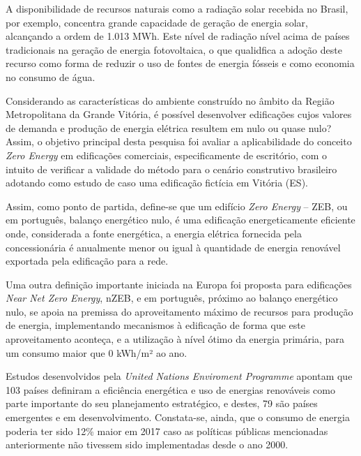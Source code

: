 \begin{onehalfspace}
    \noindent A disponibilidade de recursos naturais como a radiação solar recebida 
    no Brasil, por exemplo, concentra grande capacidade de geração de energia solar,
    alcançando a ordem de 1.013 MWh. Este nível de radiação nível acima de países 
    tradicionais na geração de energia fotovoltaica, o que qualidfica a adoção deste 
    recurso como forma de reduzir o uso de fontes de energia fósseis e como economia 
    no consumo de água.\vspace*{0.3cm}

    \noindent Considerando as características do ambiente construído no âmbito da 
    Região Metropolitana da Grande Vitória, é possível desenvolver edificações cujos 
    valores de demanda e produção de energia elétrica resultem em nulo ou quase nulo? 
    Assim, o objetivo principal desta pesquisa foi avaliar a aplicabilidade do conceito 
    \textit{Zero Energy} em edificações comerciais, especificamente de escritório, com 
    o intuito de verificar a validade do método para o cenário construtivo brasileiro 
    adotando como estudo de caso uma edificação fictícia em Vitória (ES).\vspace*{0.3cm}

    \noindent Assim, como ponto de partida, define-se que um edifício 
    \textit{Zero Energy} – ZEB, ou em português, balanço energético nulo, é uma 
    edificação energeticamente eficiente onde, considerada a fonte energética, a 
    energia elétrica fornecida pela concessionária é anualmente menor ou igual à 
    quantidade de energia renovável exportada pela edificação para a rede.\vspace*{0.3cm}

    \noindent Uma outra definição importante iniciada na Europa foi proposta para 
    edificações \textit{Near Net Zero Energy}, nZEB, e em português, próximo ao 
    balanço energético nulo, se apoia na premissa do aproveitamento máximo 
    de recursos para produção de energia, implementando mecanismos à edificação de 
    forma que este aproveitamento aconteça, e a utilização à nível ótimo da energia 
    primária, para um consumo maior que 0 kWh/m² ao ano.\vspace*{0.3cm}

    \noindent Estudos desenvolvidos pela \textit{United Nations Enviroment Programme}
    apontam que 103 países definiram a eficiência energética e uso de energias 
    renováveis como parte importante do seu planejamento estratégico, e destes, 
    79 são países emergentes e em desenvolvimento. Constata-se, ainda, que o 
    consumo de energia poderia ter sido 12\% maior em 2017 caso as políticas 
    públicas mencionadas anteriormente não tivessem sido implementadas desde o ano 2000.\vspace*{0.3cm}


\end{onehalfspace}
